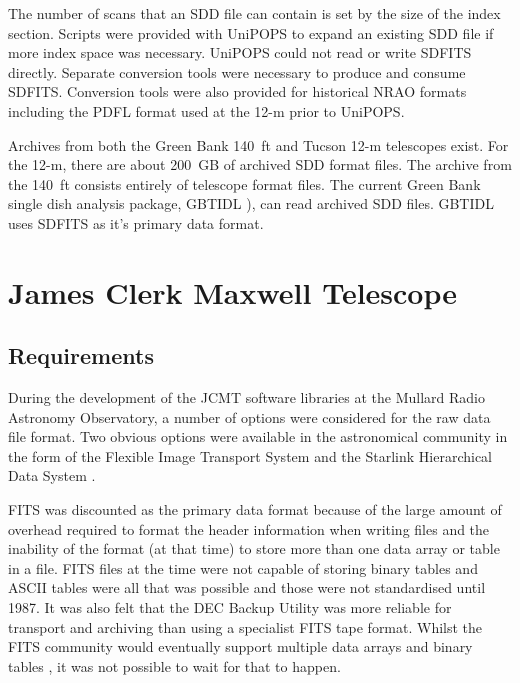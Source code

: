 \documentclass[final,authoryear,5p,times,twocolumn]{elsarticle}
\newcommand{\ascl}[1]{\href{http://www.ascl.net/#1}{ascl:#1}}
\begin{document}
The number of scans that an SDD file can contain is set
by the size of the index section.  Scripts were provided with UniPOPS
to expand an existing SDD file if more index space was necessary.
UniPOPS could not read or write SDFITS directly. Separate conversion tools
were necessary to produce and consume SDFITS.  Conversion tools were also
provided for historical NRAO formats including the PDFL format
used at the 12-m prior to UniPOPS.

Archives from both the Green Bank 140\, ft and Tucson 12-m telescopes
exist.  For the 12-m, there are about 200\, GB of archived SDD format
files.  The archive from the 140\, ft consists entirely of telescope
format files.  The current Green Bank single dish analysis package,
GBTIDL \citep[][\ascl{1303.019}]{2006ASPC..351..512M}), can read
archived SDD files.  GBTIDL uses SDFITS as it's primary data format.

\section{James Clerk Maxwell Telescope}

\subsection{Requirements}

During the development of the JCMT software libraries at the Mullard
Radio Astronomy Observatory, a number of options were considered for
the raw data file format.  Two obvious options were available in the
astronomical community in the form of the Flexible Image Transport System
\citep[FITS;][]{1981A&AS...44..363W} and the Starlink Hierarchical
Data System \citep[HDS;][\ascl{1502.009}]{1982QJRAS..23..485D,2015HDS}.

FITS was discounted as the primary data format because of the large
amount of overhead required to format the header information when
writing files and the inability of the format (at that time) to store
more than one data array or table in a file. FITS files at the time
were not capable of storing binary tables and ASCII tables were all
that was possible \citep{1988A&AS...73..365H} and those were not
standardised until 1987. It was also felt that the DEC Backup Utility
was more reliable for transport and archiving than using a specialist
FITS tape format. Whilst the FITS community would eventually support
multiple data arrays \citep{1988A&AS...73..359G} and binary tables
\citep{1995A&AS..113..159C}, it was not possible to wait for that to
happen.
\end{document}
